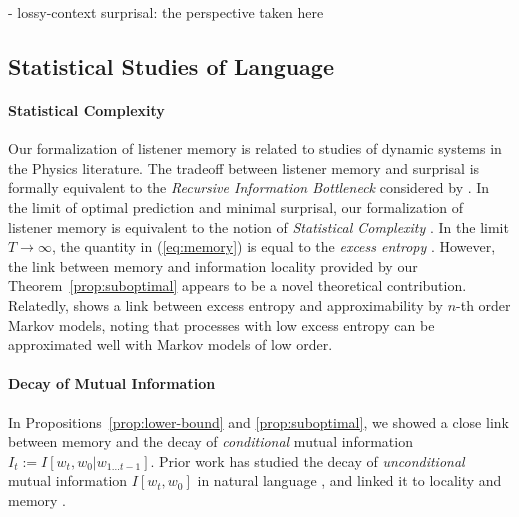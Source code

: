 - lossy-context surprisal: the perspective taken here


\subsection{Statistical Studies of Language}

\paragraph{Statistical Complexity}
Our formalization of listener memory is related to studies of dynamic systems in the Physics literature.
The tradeoff between listener memory and surprisal is formally equivalent to the \emph{Recursive Information Bottleneck} considered by \cite{still-information-2014}.
In the limit of optimal prediction and minimal surprisal, our formalization of listener memory is equivalent to the notion of \emph{Statistical Complexity} \citep{crutchfield-inferring-1989}.
In the limit $T \rightarrow \infty$, the quantity in (\ref{eq:memory}) is equal to the \emph{excess entropy} \citep{crutchfield-inferring-1989}.
However, the link between memory and information locality provided by our Theorem~\ref{prop:suboptimal} appears to be a novel theoretical contribution.
Relatedly, \cite{sharan-prediction-2016} shows a link between excess entropy and approximability by $n$-th order Markov models, noting that processes with low excess entropy can be approximated well with Markov models of low order.


\paragraph{Decay of Mutual Information}
In Propositions~\ref{prop:lower-bound} and \ref{prop:suboptimal}, we showed a close link between memory and the decay of \emph{conditional} mutual information $I_t := I[w_t, w_0 | w_{1\dots t-1}]$.
Prior work has studied the decay of \emph{unconditional} mutual information $I[w_t, w_0]$ in natural language \citep{ebeling-entropy-1994,lin-critical-2017}, and linked it to locality and memory \citep{futrell-noisy-context-2017}.


